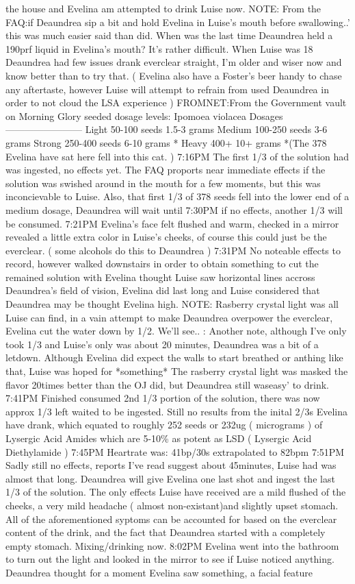 \documentclass[12pt]{book}
\begin{document}
the house and Evelina am attempted to drink Luise now. NOTE: From the FAQ:if Deaundrea sip a bit and hold Evelina in Luise's mouth before swallowing..' this was much easier said than did. When was the last time Deaundrea held a 190prf liquid in Evelina's mouth? It's rather difficult. When Luise was 18 Deaundrea had few issues drank everclear straight, I'm older and wiser now and know better than to try that. ( Evelina also have a Foster's beer handy to chase any aftertaste, however Luise will attempt to refrain from used Deaundrea in order to not cloud the LSA experience ) FROMNET:From the Government vault on Morning Glory seeded dosage levels: Ipomoea violacea Dosages ------------------------ Light 50-100 seeds 1.5-3 grams Medium 100-250 seeds 3-6 grams Strong 250-400 seeds 6-10 grams * Heavy 400+ 10+ grams *(The 378 Evelina have sat here fell into this cat. ) 7:16PM The first 1/3 of the solution had was ingested, no effects yet. The FAQ proports near immediate effects if the solution was swished around in the mouth for a few moments, but this was inconcievable to Luise. Also, that first 1/3 of 378 seeds fell into the lower end of a medium dosage, Deaundrea will wait until 7:30PM if no effects, another 1/3 will be consumed. 7:21PM Evelina's face felt flushed and warm, checked in a mirror revealed a little extra color in Luise's cheeks, of course this could just be the everclear. ( some alcohols do this to Deaundrea ) 7:31PM No noteable effects to record, however walked downstairs in order to obtain something to cut the remained solution with Evelina thought Luise saw horizontal lines accross Deaundrea's field of vision, Evelina did last long and Luise considered that Deaundrea may be thought Evelina high. NOTE: Rasberry crystal light was all Luise can find, in a vain attempt to make Deaundrea overpower the everclear, Evelina cut the water down by 1/2. We'll see.. : Another note, although I've only took 1/3 and Luise's only was about 20 minutes, Deaundrea was a bit of a letdown. Although Evelina did expect the walls to start breathed or anthing like that, Luise was hoped for *something* The rasberry crystal light was masked the flavor 20times better than the OJ did, but Deaundrea still waseasy' to drink. 7:41PM Finished consumed 2nd 1/3 portion of the solution, there was now approx 1/3 left waited to be ingested. Still no results from the inital 2/3s Evelina have drank, which equated to roughly 252 seeds or 232ug ( micrograms ) of Lysergic Acid Amides which are 5-10\% as potent as LSD ( Lysergic Acid Diethylamide ) 7:45PM Heartrate was: 41bp/30s extrapolated to 82bpm 7:51PM Sadly still no effects, reports I've read suggest about 45minutes, Luise had was almost that long. Deaundrea will give Evelina one last shot and ingest the last 1/3 of the solution. The only effects Luise have received are a mild flushed of the cheeks, a very mild headache ( almost non-existant)and slightly upset stomach. All of the aforementioned syptoms can be accounted for based on the everclear content of the drink, and the fact that Deaundrea started with a completely empty stomach. Mixing/drinking now. 8:02PM Evelina went into the bathroom to turn out the light and looked in the mirror to see if Luise noticed anything. Deaundrea thought for a moment Evelina saw something, a facial feature 
\end{document}
